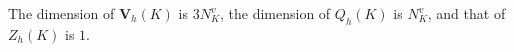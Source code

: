 \documentclass[smallextended]{svjour3}
\numberwithin{equation}{section}
\numberwithin{figure}{section}
\numberwithin{table}{section}
\newcommand\bV{\mathbf{V}}
\newcommand\bv{\boldsymbol{v}}
\newcommand\bnabla{\boldsymbol{\nabla}}
\newcommand\rmP{\mathrm{P}}
\begin{document}
	The dimension of $\bV_h(K)$ is $3 N^v_K$, the dimension of $Q_h(K)$ is $N^v_{K}$, and that of $Z_h(K)$ is $1$. 
	
\end{document}
